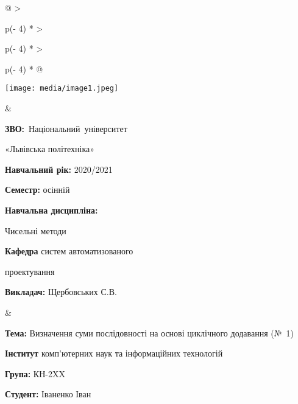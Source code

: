 \documentclass[a4paper, 12pt, oneside]{extarticle}
\begin{document}
\begin{longtable}[]{@{}
  >{\raggedright\arraybackslash}p{(\columnwidth - 4\tabcolsep) * }
  >{\raggedright\arraybackslash}p{(\columnwidth - 4\tabcolsep) * }
  >{\raggedright\arraybackslash}p{(\columnwidth - 4\tabcolsep) * }@{}}
\toprule\noalign{}
\begin{minipage}[b]{\linewidth}\raggedright
\texttt{[image: media/image1.jpeg]}
\end{minipage} & \begin{minipage}[b]{\linewidth}\raggedright
\textbf{ЗВО:}~Національний~університет

«Львівська політехніка»

\textbf{Навчальний рік:} 2020/2021

\textbf{Семестр:} осінній

\textbf{Навчальна дисципліна:}

Чисельні методи

\textbf{Кафедра} систем автоматизованого

проектування

\textbf{Викладач:} Щербовських С.В.
\end{minipage} & \begin{minipage}[b]{\linewidth}\raggedright
\textbf{Тема:} Визначення суми послідовності на основі циклічного
додавання (№~1)

\textbf{Інститут} комп'ютерних наук та інформаційних технологій

\textbf{Група:} КН-2XX

\textbf{Студент:} Іваненко Іван
\end{minipage} \\
\midrule\noalign{}
\endhead
\bottomrule\noalign{}
\endlastfoot
{} \\
 \\
\end{longtable}
\end{document}
